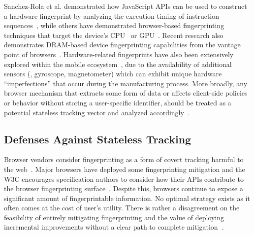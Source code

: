 %
Sanchez-Rola et al. demonstrated how JavaScript APIs can be used to construct a hardware fingerprint by analyzing the execution timing of instruction sequences~\cite{sanchez-rolaClockClockTimeBased2018}, while others have demonstrated browser-based fingerprinting techniques that target the device's CPU~\cite{trampertBrowserBasedCPUFingerprinting2022,matyuninTrackingPrivateBrowsing2018} or GPU~\cite{laorDRAWNAPARTDevice2022}. 
%
Recent research also demonstrates DRAM-based device fingerprinting capabilities from the vantage point of browsers~\cite{venugopalanFPRowhammerDRAMBasedDevice2024}.
%
Hardware-related fingerprints have also been extensively explored within the mobile ecosystem~\cite{bojinovMobileDeviceIdentification2014,dasTrackingMobileWeb2016,marcantoniLargescaleStudyRisks2019,hupperichRobustnessMobileDevice2015,deyAccelPrintImperfectionsAccelerometers2014,zhang2019sensorid}, due to the availability of additional sensors (\eg{}, gyroscope, magnetometer) which can exhibit unique hardware ``imperfections'' that occur during the manufacturing process. 
%
%
More broadly, any browser mechanism that extracts some form of data or affects client-side policies or behavior without storing a user-specific identifier, should be treated as a potential stateless tracking vector and analyzed accordingly~\cite{aliNavigatingMurkyWaters2023}. 

\subsection{Defenses Against Stateless Tracking}
\label{sec:stateless-defenses}

Browser vendors consider fingerprinting as a form of covert tracking harmful to the web~\cite{nottinghamUnsanctionedWebTracking2015}. 
%
Major browsers have deployed some fingerprinting mitigation and the W3C encourages specification authors to consider how their APIs contribute to the browser fingerprinting surface~\cite{dotyMitigatingBrowserFingerprinting2019}. 
%
Despite this, browsers continue to expose a significant amount of fingerprintable information.
%
No optimal strategy exists as it often comes at the cost of user's utility. 
%
There is rather a disagreement on the feasibility of entirely mitigating fingerprinting and the value of deploying incremental improvements without a clear path to complete mitigation~\cite{snyderBraveFingerprintingPrivacy2019,rescorlaTechnicalCommentsPrivacy2021}. 
%

